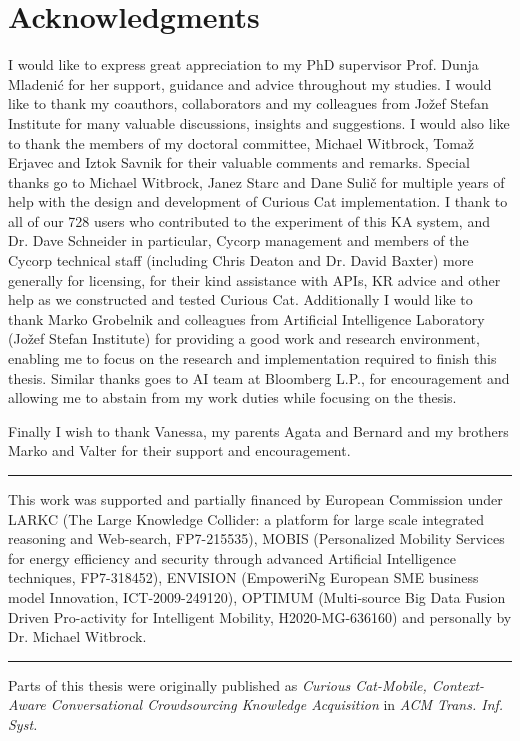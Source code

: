 % 
\chapter*{Acknowledgments}
I would like to express great appreciation to my PhD supervisor Prof. Dunja 
Mladenić for her support, guidance and advice throughout my studies. 
I would like to thank my coauthors, collaborators and
my colleagues from Jožef Stefan Institute for many valuable discussions, 
insights and suggestions. 
I would also like to thank the members of my doctoral committee, 
Michael Witbrock, Tomaž Erjavec and Iztok Savnik for their valuable comments and
remarks. 
Special thanks go to Michael Witbrock, Janez Starc and Dane Sulič for
multiple years of help with the design and development of Curious Cat 
implementation. I thank to all of our 728 users who contributed 
to the experiment of this KA system, and Dr. Dave Schneider in particular, 
Cycorp management and members of the Cycorp technical staff (including Chris 
Deaton and Dr. David Baxter) more generally for licensing, for their kind 
assistance with APIs, KR advice and other help as we constructed and 
tested Curious Cat.
Additionally I would like to thank Marko Grobelnik and colleagues from
Artificial Intelligence Laboratory (Jožef Stefan Institute) for providing a 
good work and research environment, enabling me to focus on the research and
implementation required to finish this thesis. Similar thanks goes to AI team
at Bloomberg L.P., for encouragement and allowing me to abstain from my work
duties while focusing on the thesis.

Finally I wish to thank Vanessa, my parents Agata and Bernard and my brothers
Marko and Valter for their support and encouragement.

\rule{0.5\textwidth}{.4pt}

This work was supported and partially financed by European Commission under
LARKC (The Large Knowledge Collider: a platform for large scale integrated
reasoning and Web-search, FP7-215535), MOBIS (Personalized Mobility Services 
for energy efficiency and security through advanced Artificial Intelligence 
techniques, FP7-318452), ENVISION (EmpoweriNg European SME business model 
Innovation, ICT-2009-249120), OPTIMUM (Multi-source Big Data Fusion Driven 
Pro-activity for Intelligent Mobility, H2020-MG-636160) and personally by 
Dr. Michael Witbrock.

\rule{0.5\textwidth}{.4pt}

Parts of this thesis were originally published as \emph{Curious Cat-Mobile, 
	Context-Aware Conversational Crowdsourcing Knowledge Acquisition} in 
\emph{ACM Trans. Inf. Syst.}